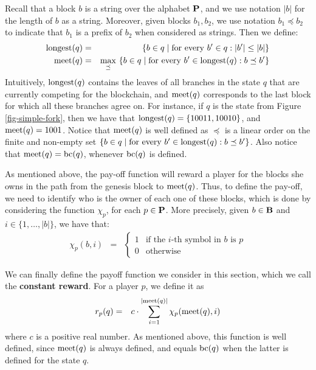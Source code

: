 Recall that a block $b$ is a string over the alphabet $\mathbf{P}$, and we use notation $|b|$ for the length of $b$ as a string. Moreover, given blocks $b_1, b_2$, we use notation $b_1 \preceq b_2$ to indicate that $b_1$ is a prefix of $b_2$  when considered as strings. Then we define: 
\begin{eqnarray*}
{\text{\rm longest}}(q) & = & \{ b \in q \mid \text{for every } b' \in q: |b'| \leq |b|\}\\
\text{\rm meet}(q) & = & {\displaystyle \max_{\preceq} \ \{b \in q \mid \text{for every } b' \in {\text{\rm longest}}(q): b \preceq b'\}}
\end{eqnarray*}
Intuitively, ${\text{\rm longest}}(q)$ contains the leaves of all branches in the state $q$ that are currently competing for the blockchain, and $\text{\rm meet}(q)$ corresponds to the last block for which all these branches agree on. For instance, if $q$ is the state from Figure \ref{fig-simple-fork}, then we have that ${\text{\rm longest}}(q)=\{10011,10010\}$, and $\text{\rm meet}(q)=1001$. Notice that $\text{\rm meet}(q)$ is well defined as $\preceq$ is a linear order on the finite and non-empty set $\{b \in q \mid \text{for every } b' \in {\text{\rm longest}}(q): b \preceq b'\}$. Also notice that $\text{\rm meet}(q)=\text{bc}(q)$, whenever $\text{bc}(q)$ is defined.

As mentioned above, the pay-off function will reward a player for the blocks she owns in the path from the genesis block to $\text{\rm meet}(q)$. Thus, to define the pay-off, we need to identify who is the owner of each one of these blocks, which is done by considering the function $\chi_p$, for each $p \in \mathbf{P}$. More precisely, given $b \in \mathbf{B}$ and $i \in \{1, \ldots, |b|\}$, we have that:
\begin{eqnarray*}
\chi_p(b,i) & = & 
\begin{cases}
1 & \text{if the } i\text{-th symbol in } b \text{ is } p\\
0 & \text{otherwise}
\end{cases}
\end{eqnarray*}

We can finally define the payoff function we consider in this section, which we call the \textbf{constant reward}. For a player $p$, we define it as 
\begin{eqnarray*}
r_p(q) & = & 
{\displaystyle c \cdot \sum_{i=1}^{|\text{\rm meet}(q)|} \chi_p(\text{\rm meet}(q),i)} 
\end{eqnarray*}
where $c$ is a positive real number. As mentioned above, this function is well defined, since $\text{\rm meet}(q)$ is always defined, and equals $\text{bc}(q)$ when the latter is defined for the state $q$.
 
